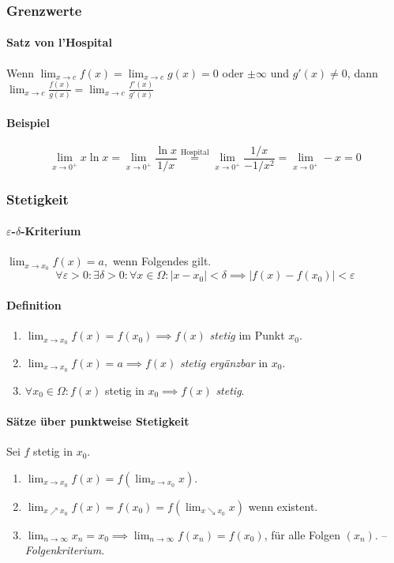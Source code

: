 \documentclass[a4paper, 9pt, DIV=24]{scrartcl}
\begin{document}
\subsubsection{Grenzwerte}
\paragraph{Satz von l'Hospital}
Wenn $\lim_{x \to c}f(x) = \lim_{x \to c}g(x)= 0 $ oder $\pm\infty$ und $g'(x)\neq 0$, dann $\lim_{x\to c}\frac{f(x)}{g(x)} = \lim_{x\to c}\frac{f'(x)}{g'(x)}$
\paragraph{Beispiel}
\[ \lim_{x\to 0^+} x \ln x =\lim_{x\to 0^+}{\frac{\ln x}{1/x}} \overset{\text{Hospital}}{=}\lim_{x\to 0^+}{\frac{1/x}{-1/x^2}} =\lim_{x\to 0^+} -x= 0 \]

\subsubsection{Stetigkeit}
\paragraph{$\varepsilon$-$\delta$-Kriterium} $\lim_{x\to x_0} f(x) = a, $ wenn Folgendes gilt.
\[\forall\varepsilon>0:\exists\delta>0: \forall x \in \Omega: |x-x_0| < \delta \implies |f(x) - f(x_0)| < \varepsilon \]
\paragraph{Definition}
\begin{enumerate}[label={(}\arabic*{)}]
 \item $\lim_{x\to x_0} f(x) = f(x_0) \implies f(x)$ \emph{stetig} im Punkt $x_0$.
 \item $\lim_{x\to x_0} f(x) = a \implies f(x)$ \emph{stetig ergänzbar} in $x_0$.
 \item $\forall x_0\in\Omega: f(x) $ stetig in $x_0 \implies f(x)$ \emph{stetig}.
\end{enumerate}
 
\paragraph{Sätze über punktweise Stetigkeit}
Sei $f$ stetig in $x_0$.
\begin{enumerate}[label={(}\arabic*{)}]
 \item $\lim_{x\to x_0} f(x) = f(\lim_{x\to x_0} x)$.
 \item $\lim_{x\nearrow x_0} f(x) = f(x_0) = f(\lim_{x\searrow x_0} x)$ wenn existent.
 \item $\lim_{n\to \infty} x_n = x_0 \implies \lim_{n\to \infty} f(x_n) = f(x_0)$, für alle Folgen $(x_n)$. -- \emph{Folgenkriterium}.
\end{enumerate}
\end{document}
